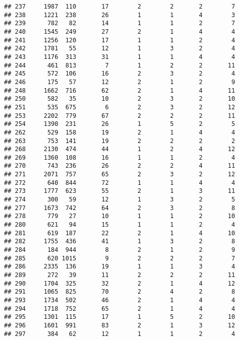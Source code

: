 \documentclass[]{article}
\begin{document}
\begin{verbatim}
## 237     1987  110       17        2        2       2        7
## 238     1221  238       26        1        1       4        3
## 239      782   82       14        1        1       2        7
## 240     1545  249       27        2        1       4        4
## 241     1256  120       17        1        1       2        4
## 242     1781   55       12        1        3       2        4
## 243     1176  313       31        1        1       4        4
## 244      461  813        7        1        2       2       11
## 245      572  106       16        2        3       2        4
## 246      175   57       12        2        1       2        9
## 248     1662  716       62        2        1       4       11
## 250      582   35       10        2        3       2       10
## 251      535  675        6        2        3       2       12
## 253     2202  779       67        2        2       2       11
## 254     1390  231       26        1        5       2        5
## 262      529  158       19        2        1       4        4
## 263      753  141       19        2        2       2        2
## 268     2130  474       44        1        2       4       12
## 269     1360  108       16        1        1       2        4
## 270      743  236       26        2        2       4       11
## 271     2071  757       65        2        3       2       12
## 272      640  844       72        1        1       4        4
## 273     1777  623       55        2        1       3       11
## 274      300   59       12        1        3       2        5
## 277     1673  742       64        2        3       2        8
## 278      779   27       10        1        1       2       10
## 280      621   94       15        1        1       2        4
## 281      619  187       22        2        1       4       10
## 282     1755  436       41        1        3       2        8
## 284      184  944        8        2        1       2        9
## 285      620 1015        9        2        2       2        7
## 286     2335  136       19        1        1       3        4
## 289      272   39       11        2        2       2       11
## 290     1704  325       32        2        1       4       12
## 291     1065  825       70        2        4       2        8
## 293     1734  502       46        2        1       4        4
## 294     1718  752       65        2        1       4        4
## 295     1301  115       17        1        5       2       10
## 296     1601  991       83        2        1       3       12
## 297      384   62       12        1        1       2        4

\end{verbatim}
\end{document}

